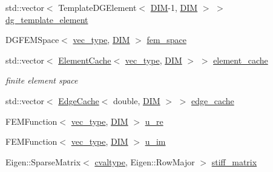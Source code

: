 \begin{DoxyCompactItemize}
\item 
std\+::vector$<$ Template\+D\+G\+Element$<$ \mbox{\hyperlink{complex__node___t_h_f_e_m_2uiexp_8h_a589b8b9bfdf714f736059845d568b597}{D\+IM}}-\/1, \mbox{\hyperlink{complex__node___t_h_f_e_m_2uiexp_8h_a589b8b9bfdf714f736059845d568b597}{D\+IM}} $>$ $>$ \mbox{\hyperlink{classui_experiment_ac5384376bf5ff36cb3d5784876972f4d}{dg\+\_\+template\+\_\+element}}
\item 
D\+G\+F\+E\+M\+Space$<$ \mbox{\hyperlink{complex__edge___t_h_f_e_m_2emdefs_8h_a0a0de407de54661e0d56aa8686c104d9}{vec\+\_\+type}}, \mbox{\hyperlink{complex__node___t_h_f_e_m_2uiexp_8h_a589b8b9bfdf714f736059845d568b597}{D\+IM}} $>$ \mbox{\hyperlink{classui_experiment_ad4b0994c9d2bd5691065434080468700}{fem\+\_\+space}}
\item 
std\+::vector$<$ \mbox{\hyperlink{struct_element_cache}{Element\+Cache}}$<$ \mbox{\hyperlink{complex__edge___t_h_f_e_m_2emdefs_8h_a0a0de407de54661e0d56aa8686c104d9}{vec\+\_\+type}}, \mbox{\hyperlink{complex__node___t_h_f_e_m_2uiexp_8h_a589b8b9bfdf714f736059845d568b597}{D\+IM}} $>$ $>$ \mbox{\hyperlink{classui_experiment_a86da24faea838d0a39a7b89d2f09c81c}{element\+\_\+cache}}
\begin{DoxyCompactList}\small\item\em finite element space \end{DoxyCompactList}\item 
std\+::vector$<$ \mbox{\hyperlink{struct_edge_cache}{Edge\+Cache}}$<$ double, \mbox{\hyperlink{complex__node___t_h_f_e_m_2uiexp_8h_a589b8b9bfdf714f736059845d568b597}{D\+IM}} $>$ $>$ \mbox{\hyperlink{classui_experiment_a8c9962fa5c8eefe78f7d0612e0fd7dd2}{edge\+\_\+cache}}
\item 
F\+E\+M\+Function$<$ \mbox{\hyperlink{complex__edge___t_h_f_e_m_2emdefs_8h_a0a0de407de54661e0d56aa8686c104d9}{vec\+\_\+type}}, \mbox{\hyperlink{complex__node___t_h_f_e_m_2uiexp_8h_a589b8b9bfdf714f736059845d568b597}{D\+IM}} $>$ \mbox{\hyperlink{classui_experiment_aabad5b9464e03403d9c443b5130325f9}{u\+\_\+re}}
\item 
F\+E\+M\+Function$<$ \mbox{\hyperlink{complex__edge___t_h_f_e_m_2emdefs_8h_a0a0de407de54661e0d56aa8686c104d9}{vec\+\_\+type}}, \mbox{\hyperlink{complex__node___t_h_f_e_m_2uiexp_8h_a589b8b9bfdf714f736059845d568b597}{D\+IM}} $>$ \mbox{\hyperlink{classui_experiment_aa50bc0a5012bc931d4d42ca06c303a45}{u\+\_\+im}}
\item 
Eigen\+::\+Sparse\+Matrix$<$ \mbox{\hyperlink{complex__edge___t_h_f_e_m_2emdefs_8h_a97d2dbb382a9b25c16c04fc1e1baacdb}{cvaltype}}, Eigen\+::\+Row\+Major $>$ \mbox{\hyperlink{classui_experiment_a8e554eb0972c60b11ee11dc44753ae97}{stiff\+\_\+matrix}}

\end{DoxyCompactItemize}

